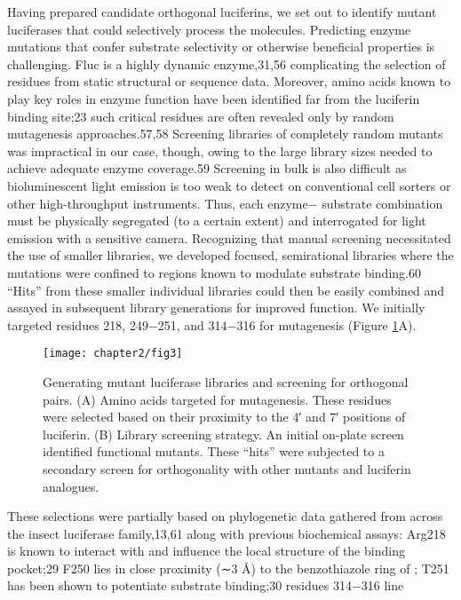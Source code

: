Having prepared
candidate orthogonal luciferins, we set out to identify
mutant luciferases that could selectively process the molecules.
Predicting enzyme mutations that confer substrate selectivity or
otherwise beneficial properties is challenging. Fluc is a highly
dynamic enzyme,31,56 complicating the selection of residues
from static structural or sequence data. Moreover, amino acids
known to play key roles in enzyme function have been
identified far from the luciferin binding site;23 such critical
residues are often revealed only by random mutagenesis
approaches.57,58 Screening libraries of completely random
mutants was impractical in our case, though, owing to the
large library sizes needed to achieve adequate enzyme
coverage.59 Screening in bulk is also difficult as bioluminescent
light emission is too weak to detect on conventional cell sorters
or other high-throughput instruments. Thus, each enzyme−
substrate combination must be physically segregated (to a
certain extent) and interrogated for light emission with a
sensitive camera.
Recognizing that manual screening necessitated the use of
smaller libraries, we developed focused, semirational libraries
where the mutations were confined to regions known to
modulate substrate binding.60 “Hits” from these smaller
individual libraries could then be easily combined and assayed
in subsequent library generations for improved function. We
initially targeted residues 218, 249−251, and 314−316 for
mutagenesis (Figure \ref{fig:residues_screening}A).
\begin{figure}[htbp]
\texttt{[image: chapter2/fig3]}
\centering
\caption[Generating mutant luciferase libraries and screening for orthogonal pairs]{Generating mutant luciferase libraries and screening for orthogonal pairs. (A) Amino acids targeted for mutagenesis. These residues were
selected based on their proximity to the 4′ and 7′ positions of luciferin. (B) Library screening strategy. An initial on-plate screen identified functional
mutants. These “hits” were subjected to a secondary screen for orthogonality with other mutants and luciferin analogues.}
  \label{fig:residues_screening}
\end{figure}
These selections were partially based on phylogenetic data gathered from across the insect luciferase
family,13,61 along with previous biochemical assays: Arg218 is
known to interact with \dluciferin{} and influence the local
structure of the binding pocket;29 F250 lies in close proximity
(∼3 Å) to the benzothiazole ring of \dluciferin{}; T251 has been
shown to potentiate substrate binding;30 residues 314−316 line
